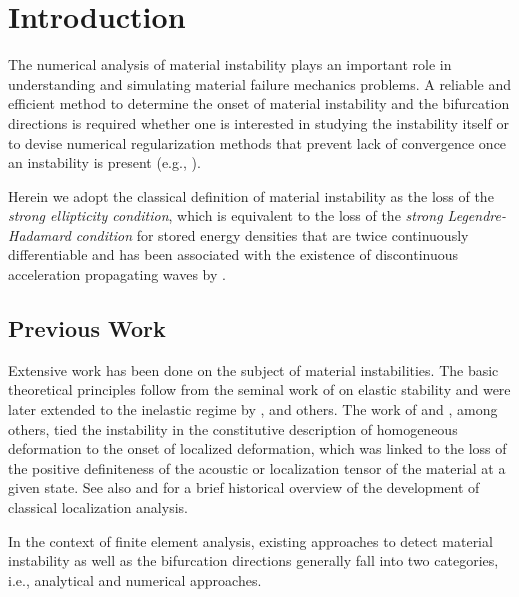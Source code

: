 \documentclass[12pt]{article}
\numberwithin{equation}{section}
\begin{document}
\section{Introduction}
\label{sec:intro}

The numerical analysis of material instability plays an important role 
in understanding and simulating material failure mechanics problems. A 
reliable and efficient method to determine the onset of material 
instability and the bifurcation directions is required whether one is 
interested in studying the instability itself or to devise numerical 
regularization methods that prevent lack of convergence once an 
instability is present (e.g., \cite{Simo.etal:1993, Oliver:1996a, Oliver:1996b, Armero.Garikipati:1996, Moes.Belytschko:2002, Foster.etal:2007, Chen.etal:2011}).

Herein we adopt the classical definition of material instability as 
the loss of the \emph{strong ellipticity condition}, which is  
equivalent to the loss of the \emph{strong Legendre-Hadamard 
condition} for stored energy densities that are twice continuously 
differentiable \citep{Antman:2005} and has been associated with the 
existence of discontinuous acceleration propagating waves by 
\citet{Hill:1962}.

\subsection{Previous Work}

Extensive work has been done on the subject of material instabilities.  
The basic theoretical principles follow from the seminal work of 
\citet{Hadamard:1903} on elastic stability and were later extended to 
the inelastic regime by \citet{Thomas:1961}, \citet{Hill:1962} and 
others. The work of \citet{Rice:1976} and \citet{Rudnicki.Riche:1975}, 
among others, tied the instability in the constitutive description of 
homogeneous deformation to the onset of localized deformation, which 
was linked to the loss of the positive definiteness of the acoustic or 
localization tensor of the material at a given state. See also 
\citet*{Armero.Garikipati:1996} and \citet*{Miehe.etal:2004} for a 
brief historical overview of the development of classical localization 
analysis.

In the context of finite element analysis, existing approaches to 
detect material instability as well as the bifurcation directions 
generally fall into two categories, i.e., analytical and numerical 
approaches.
\end{document}
